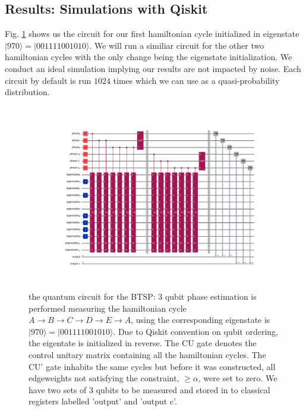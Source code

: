 \documentclass[msc,oneside]{ubcthesis}
\begin{document}
		\subsection{Results: Simulations with Qiskit}  \label{5-city-sim}
	
	Fig. \ref{fig:5-city-circuit} shows us the circuit for our first hamiltonian cycle initialized in eigenstate $|970\rangle  = |001111001010\rangle$. We will run a similiar circuit for the other two hamiltonian cycles with the only change being the eigenstate initialization. We conduct an ideal simulation implying our results are not impacted by noise. Each circuit by default is run $1024$ times which we can use as a quasi-probability distribution. 
	
	\begin{figure}[!h]
		\centering
		\includegraphics[trim={8.5cm 4.4cm 6cm 4.4cm},clip, width=1 \linewidth]{"graphics/5-city-1-cycle-constrained-barrier"}
		\caption{the quantum circuit for the BTSP: 3 qubit phase estimation is performed measuring the hamiltonian cycle $A \rightarrow B \rightarrow C \rightarrow D \rightarrow E \rightarrow A$, using the corresponding eigenstate is $|970\rangle  = |001111001010\rangle$. Due to Qiskit convention on qubit ordering, the eigentate is initialized in reverse. The CU gate denotes the control unitary matrix containing all the hamiltonian cycles. The CU' gate inhabits the same cycles but before it was constructed, all edgeweights not satisfying the constraint, $\geq \alpha$, were set to zero. We have two sets of 3 qubits to be measured and stored in to classical registers labelled 'output' and 'output c'.}
		\label{fig:5-city-circuit}
	\end{figure}
	
\end{document}
